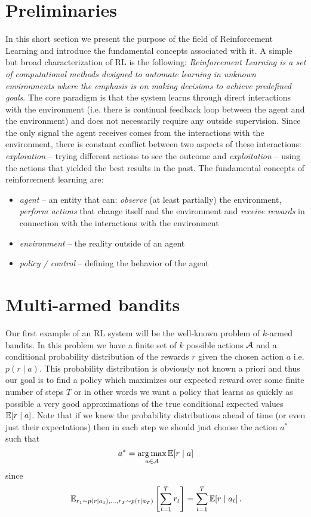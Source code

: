 \documentclass{myclass}
\begin{document}
\section{Preliminaries}

In this short section we present the purpose of the field of Reinforcement Learning and introduce
the fundamental concepts associated with it. A simple but broad characterization of RL is the
following: \emph{Reinforcement Learning is a set of computational methods designed to automate
learning in unknown environments where the emphasis is on making decisions to achieve predefined
goals}. The core paradigm is that the system learns through direct interactions with the environment
(i.e. there is continual feedback loop between the agent and the environment) and does not
necessarily require any outside supervision. Since the only signal the agent receives comes from the
interactions with the environment, there is constant conflict between two aspects of these
interactions: \emph{exploration} -- trying different actions to see the outcome and
\emph{exploitation} -- using the actions that yielded the best results in the past. The fundamental
concepts of reinforcement learning are:
\begin{itemize}

    \item \emph{agent} -- an entity that can: \emph{observe} (at least partially) the environment,
    \emph{perform actions} that change itself and the environment and \emph{receive rewards} in
    connection with the interactions with the environment

    \item \emph{environment} -- the reality outside of an agent

    \item \emph{policy / control} -- defining the behavior of the agent

\end{itemize}


\section{Multi-armed bandits}

Our first example of an RL system will be the well-known problem of $k$-armed bandits. In this
problem we have a finite set of $k$ possible actions $\mathcal{A}$ and a conditional probability
distribution of the rewards $r$ given the chosen action $a$ i.e. $p(r \mid a)$. This probability
distribution is obviously not known a priori and thus our goal is to find a policy which maximizes
our expected reward over some finite number of steps $T$ or in other words we want a policy that
learns as quickly as possible a very good approximations of the true conditional expected values
$\mathbb{E}[r \mid a]$. Note that if we knew the probability distributions ahead of time (or even just
their expectations) then in each step we should just choose the action $a^*$ such that
\[
    a^* = \operatorname*{arg\,max}_{a \in \mathcal{A}} \mathbb{E}[r \mid a]
\]
since
\[
    \mathbb{E}_{r_1 \sim p(r \mid a_1), \ldots, r_T \sim p(r \mid a_T)} \left[ \sum_{t=1}^T r_t \right] = \sum_{t=1}^T \mathbb{E}[r \mid a_t]\,.
\]
\end{document}
